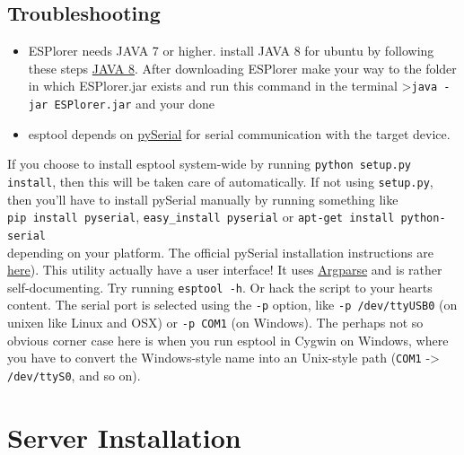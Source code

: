 \documentclass[16pt]{article}
\begin{document}
\subsection{Troubleshooting}

\begin{itemize}

\item
  ESPlorer needs JAVA 7 or higher. install JAVA 8 for ubuntu by
  following these steps
  {\color{red}\href{http://tecadmin.net/install-oracle-java-8-jdk-8-ubuntu-via-ppa/}{JAVA 8}}.
  After downloading ESPlorer make your way to the folder in which
  ESPlorer.jar exists and run this command in the terminal
  \textgreater{}\texttt{java -jar ESPlorer.jar} and your done
\item
  esptool depends on {\color{red}\href{http://pyserial.sourceforge.net/}{pySerial}}
  for serial communication with the target device.
\end{itemize}

If you choose to install esptool system-wide by running
\texttt{python setup.py install}, then this will be taken care of
automatically.
If not using \texttt{setup.py}, then you'll have to install pySerial
manually by running something like \\

\texttt{pip install pyserial},
\texttt{easy\_install pyserial} or
\texttt{apt-get install python-serial} \\
\vspace{0.3cm}
depending on your platform. The
official pySerial installation instructions are
{\color{red}\href{http://pyserial.sourceforge.net/pyserial.html\#installation}{here}}).
This utility actually have a user interface! It uses
{\color{red}\href{https://docs.python.org/dev/library/argparse.html}{Argparse}}
and is rather self-documenting. Try running \texttt{esptool -h}. Or hack the
script to your hearts content. The serial port is selected using the
\texttt{-p} option, like \texttt{-p /dev/ttyUSB0} (on unixen like Linux
and OSX) or \texttt{-p COM1} (on Windows). The perhaps not so obvious
corner case here is when you run esptool in Cygwin on Windows, where you
have to convert the Windows-style name into an Unix-style path
(\texttt{COM1} -\textgreater{} \texttt{/dev/ttyS0}, and so on).

\vspace{19cm}

\section{Server Installation}
 
\end{document}
